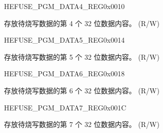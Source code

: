 \begin{register}{H}{EFUSE\_PGM\_DATA4\_REG}{0x0010}\label{regdesc:EFUSEPGMDATA4REG}
%
\regnewline%
\begin{regdesc}\begin{reglist}
\label{fielddesc:EFUSEPGMDATA4}\item [EFUSE\_PGM\_DATA\_4] 存放待烧写数据的第 4 个 32 位数据内容。 (R/W)
\end{reglist}\end{regdesc}
\end{register}


\begin{register}{H}{EFUSE\_PGM\_DATA5\_REG}{0x0014}\label{regdesc:EFUSEPGMDATA5REG}
%
\regnewline%
\begin{regdesc}\begin{reglist}
\label{fielddesc:EFUSEPGMDATA5}\item [EFUSE\_PGM\_DATA\_5] 存放待烧写数据的第 5 个 32 位数据内容。 (R/W)
\end{reglist}\end{regdesc}
\end{register}


\begin{register}{H}{EFUSE\_PGM\_DATA6\_REG}{0x0018}\label{regdesc:EFUSEPGMDATA6REG}
%
\regnewline%
\begin{regdesc}\begin{reglist}
\label{fielddesc:EFUSEPGMDATA6}\item [EFUSE\_PGM\_DATA\_6] 存放待烧写数据的第 6 个 32 位数据内容。 (R/W)
\end{reglist}\end{regdesc}
\end{register}


\begin{register}{H}{EFUSE\_PGM\_DATA7\_REG}{0x001C}\label{regdesc:EFUSEPGMDATA7REG}
%
\regnewline%
\begin{regdesc}\begin{reglist}
\label{fielddesc:EFUSEPGMDATA7}\item [EFUSE\_PGM\_DATA\_7] 存放待烧写数据的第 7 个 32 位数据内容。 (R/W)
\end{reglist}\end{regdesc}
\end{register}


